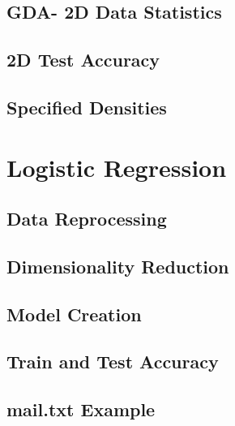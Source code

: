 \documentclass{article}
\begin{document}
\subsection{GDA- 2D Data Statistics}
\subsection{2D Test Accuracy}
\subsection{Specified Densities}

\section{Logistic Regression}
\subsection{Data Reprocessing}
\subsection{Dimensionality Reduction}
\subsection{Model Creation}
\subsection{Train and Test Accuracy}
\subsection{mail.txt Example}
\end{document}

